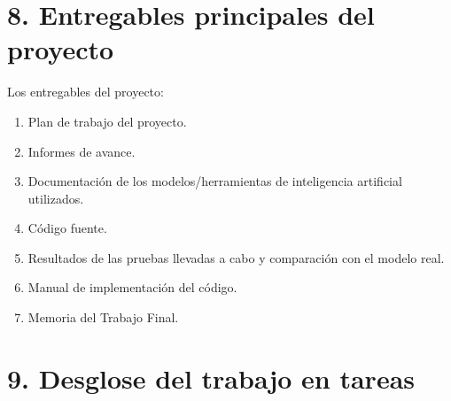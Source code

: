 \documentclass[
11pt, %
codirector, %
]{charter}
\begin{document}
\section{8. Entregables principales del proyecto}

Los entregables del proyecto:

\begin{enumerate}
	\item Plan de trabajo del proyecto.
	\item Informes de avance.
	\item Documentación de los modelos/herramientas de inteligencia artificial utilizados.
	\item Código fuente.
	\item Resultados de las pruebas llevadas a cabo y comparación con el modelo real.
	\item Manual de implementación del código.
	\item Memoria del Trabajo Final.
\end{enumerate}


\section{9. Desglose del trabajo en tareas}
\label{sec:wbs}
\end{document}
